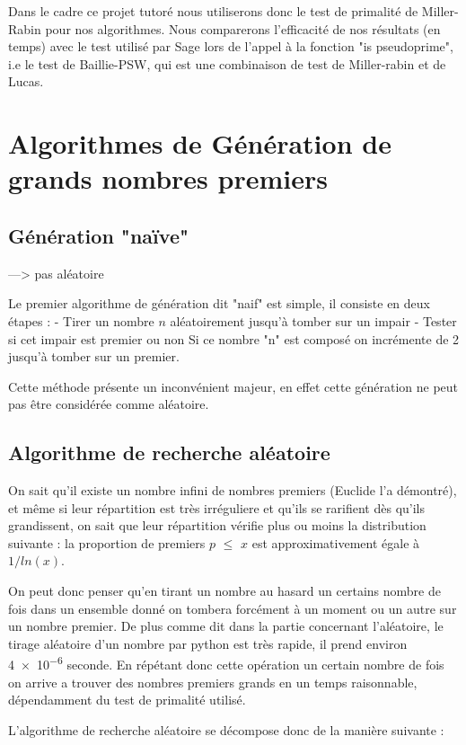 \documentclass[a4paper,11pt]{article}
\begin{document}
Dans le cadre ce projet tutoré nous utiliserons donc le test de primalité de Miller-Rabin pour nos algorithmes. Nous comparerons l'efficacité de nos résultats (en temps) avec le test utilisé par Sage lors de l'appel à la fonction "is pseudoprime", i.e le test de Baillie-PSW, qui est une combinaison de test de Miller-rabin et de Lucas.


\section{Algorithmes de Génération de grands nombres premiers}

\subsection{Génération "naïve"}

---> pas aléatoire 

Le premier algorithme de génération dit "naif" est simple, il consiste en deux étapes :
    - Tirer un nombre $n$ aléatoirement jusqu'à tomber sur un impair
    - Tester si cet impair est premier ou non
        Si ce nombre "n" est composé on incrémente de 2 jusqu'à tomber sur un premier.
    
Cette méthode présente un inconvénient majeur, en effet cette génération ne peut pas être considérée comme aléatoire. 

\subsection{Algorithme de recherche aléatoire }
On sait qu'il existe un nombre infini de nombres premiers (Euclide l'a démontré),  et même si leur répartition est très irréguliere et qu'ils se rarifient dès qu'ils grandissent, on sait que leur répartition vérifie plus ou moins la distribution suivante :
la proportion de premiers $p$ $\leq$ $x$ est approximativement égale à $1/ln(x)$.


On peut donc penser qu'en tirant un nombre au hasard un certains nombre de fois dans un ensemble donné on tombera forcément à un moment ou un autre sur un nombre premier.
De plus comme dit dans la partie concernant l'aléatoire, le tirage aléatoire d'un nombre par python est très rapide, il prend environ  \num{4e-6} seconde. En répétant donc cette opération un certain nombre de fois on arrive a trouver des nombres premiers grands en un temps raisonnable, dépendamment du test de primalité utilisé. 

L'algorithme de recherche aléatoire se décompose donc de la manière suivante : 
\end{document}
